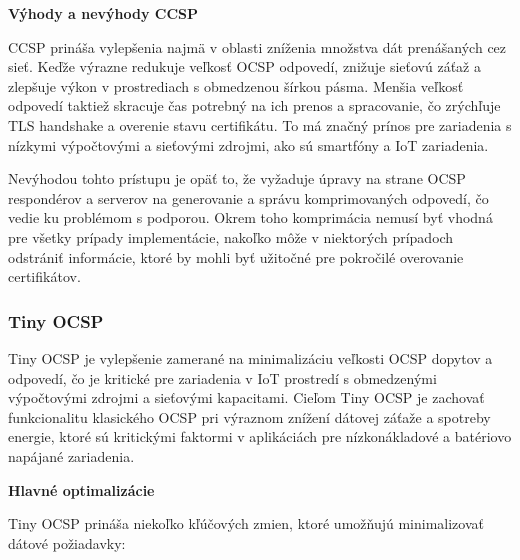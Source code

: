 \documentclass[12pt, twoside]{book}
\newcommand{\subsubsubsection}[1]{%
  \vspace{0.2em}  
  \textbf{#1} \\[0.2em]
  \hspace*{\parindent}
}
\begin{document}
\subsubsubsection{Výhody a nevýhody CCSP}
CCSP prináša vylepšenia najmä v oblasti zníženia množstva dát prenášaných cez sieť. Keďže výrazne redukuje veľkosť OCSP odpovedí, znižuje sieťovú záťaž a zlepšuje výkon v prostrediach s obmedzenou šírkou pásma. Menšia veľkosť odpovedí taktiež skracuje čas potrebný na ich prenos a spracovanie, čo zrýchľuje TLS handshake a overenie stavu certifikátu. To má značný prínos pre zariadenia s nízkymi výpočtovými a sieťovými zdrojmi, ako sú smartfóny a IoT zariadenia.

Nevýhodou tohto prístupu je opäť to, že vyžaduje úpravy na strane OCSP respondérov a serverov na generovanie a správu komprimovaných odpovedí, čo vedie ku problémom s podporou. Okrem toho komprimácia nemusí byť vhodná pre všetky prípady implementácie, nakoľko môže v niektorých prípadoch odstrániť informácie, ktoré by mohli byť užitočné pre pokročilé overovanie certifikátov. 

\subsubsection{Tiny OCSP}
Tiny OCSP je vylepšenie zamerané na minimalizáciu veľkosti OCSP dopytov a odpovedí, čo je kritické pre zariadenia v IoT prostredí s obmedzenými výpočtovými zdrojmi a sieťovými kapacitami. Cieľom Tiny OCSP je zachovať funkcionalitu klasického OCSP pri výraznom znížení dátovej záťaže a spotreby energie, ktoré sú kritickými faktormi v aplikáciách pre nízkonákladové a batériovo napájané zariadenia.

\subsubsubsection{Hlavné optimalizácie}
Tiny OCSP prináša niekoľko kľúčových zmien, ktoré umožňujú minimalizovať dátové požiadavky:
\end{document}
